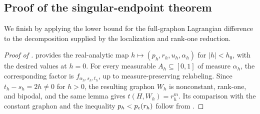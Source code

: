 \subsection{Proof of the singular-endpoint theorem}
\label{sec:singular-proof}

We finish by applying the lower bound for the full-graphon Lagrangian
difference to the decomposition supplied by the localization and rank-one
reduction.

\begin{proof}[Proof of ]
 provides the real-analytic map
$h\mapsto(p_h,r_h,u_h,\alpha_h)$ for $|h|<h_0$, with the desired
values at $h=0$.  For every measurable $A_h\subseteq[0,1]$ of measure
$\alpha_h$, the corresponding factor is $f_{\alpha_h,s_h,t_h}$, up to measure-preserving relabeling.
Since $t_h-s_h=2h\ne0$ for $h>0$, the resulting graphon $W_h$ is
nonconstant, rank-one, and bipodal, and the same lemma gives
$t(H,W_h)=r_h^m$.  Its comparison with the constant graphon and
the inequality $p_h<p_{\mathrm c}(r_h)$ follow from .


\end{proof}
